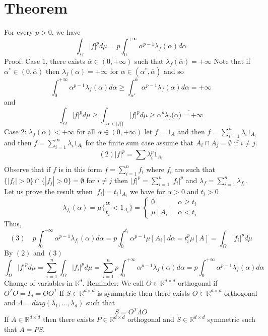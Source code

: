 \documentclass[11pt]{article}
\begin{document}
\section{Theorem}
For every $p > 0$, we have
\[
\int_{\Omega}^{}|f|^{p} d \mu = p \int_{0}^{+\infty}\alpha^{p-1}\lambda_f(\alpha) d \alpha
\] 
Proof: Case 1, there exists $\overline{\alpha} \in (0, +\infty)$ such that $\lambda_f(\overline{\alpha}) = +\infty$ Note that if $\alpha^{*} \in (0, \overline{ \alpha})$ then $\lambda_f(\alpha) = +\infty$ for $\alpha \in (\alpha^{*}, \overline{ \alpha})$
and so
\[
\int_{0}^{+\infty}\alpha^{p-1}\lambda_f(\alpha) d \alpha \ge \int_{\alpha^{*}}^{\overline{\alpha}} \alpha^{p-1} \lambda_f(\alpha) d \alpha = + \infty
\] 
and
\[
    \int_{\Omega}^{}|f|^{p}d \mu \ge \int_{\{\overline{\alpha} < |f|\}}^{}|f|^{p} d \mu \ge \overline{\alpha}^{p} \lambda_f( \overline{ \alpha) = +\infty}
\] 
Case 2: $\lambda_f(\alpha) < +\infty$ for all $\alpha \in (0, +\infty)$ let  $f = 1_A$ and then $f = \sum_{i=1}^{n}\lambda_i 1_{A_i}$ and then $f = \sum_{i=1}^{\infty}\lambda_i 1_{A_i}$ for the finite sum case assume that $A_i \cap A_j = \emptyset$ if  $i \ne j$.
 \[
     (2)    |f|^{p} = \sum_{}^{}\lambda_i^{p} 1_{A_i}
\] 
Observe that if $f$ is in this form $f = \sum_{i=1}^{n}f_i$ where $f_i$ are such that  $\{|f_i| > 0\} \cap \{|f_j| > 0\} = \emptyset$ for  $i \ne j$
then  $|f|^{p} = \sum_{i=1}^{n}|f_i|^{p}$ and $\lambda_f = \sum_{i=1}^{n} \lambda_{f_i}$.
Let us prove the result when $|f_i| = t_i1_{A_i}$ we have for $\alpha > 0$ and $t_i > 0$
 \[
     \lambda_{f_i}(\alpha) = \mu\{ \frac{\alpha}{t_i} < 1_{A_i}\} = 
     \begin{cases}
         0 & \alpha \ge t_i\\ \mu[A_i] & \alpha < t_i \end{cases}
\] 
Thus,
\[
    (3) \quad    p \int_{0}^{+\infty}\alpha^{p-1} \lambda_{f_i}(\alpha) d \alpha = p \int_{0}^{t_i} \alpha^{p-1} \mu[A_i] d \alpha = t_i^{p} \mu[A] = \int_{\Omega}^{}|f_i|^{p} d \mu
\] 
By $(2)$ and  $(3)$
 \[
\int_{\Omega}^{}|f|^{p} d\mu = \sum_{i=1}^{n} \int_{\Omega}^{}|f_i|^{p} d\mu = \sum_{i=1}^{n} p \int_{0}^{+\infty} \alpha^{p-1}\lambda_f(\alpha) d \alpha = p \int_{0}^{+\infty} \alpha^{p-1} \lambda_f(\alpha) d \alpha
\] 
Change of variables in $ \mathbb{R}^{d}$. Reminder: We call $O \in \mathbb{R}^{d \times d}$ orthogonal if $O^{T}O = I_d = OO^{T}$ 
If $S \in \mathbb{R}^{d \times d}$ is symmetric then there exists $O \in \mathbb{R}^{d\times d}$ orthogonal and $\Lambda = diag(\lambda_1,\dots,\lambda_d)$ such that
\[
S = O^{T} \Lambda O
\] 
If $A \in \mathbb{R}^{d \times d}$ then there exists $P \in \mathbb{R}^{d \times d}$ orthogonal and $S \in \mathbb{R}^{d \times d}$ symmetric such that $A = PS$.
\end{document}
